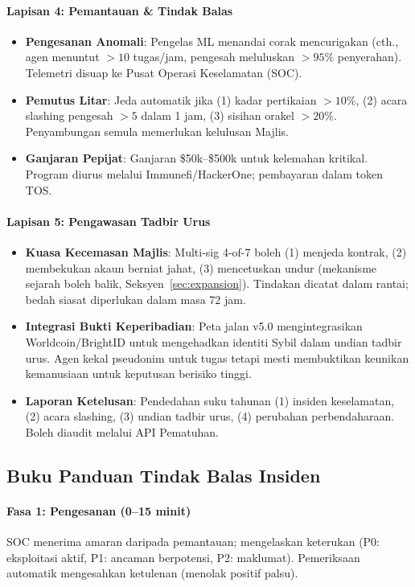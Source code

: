 \documentclass[11pt]{article}
\begin{document}
\paragraph{Lapisan 4: Pemantauan \& Tindak Balas}
\begin{itemize}[noitemsep]
  \item \textbf{Pengesanan Anomali}: Pengelas ML menandai corak mencurigakan (cth., agen menuntut $>10$ tugas/jam, pengesah meluluskan $>95\%$ penyerahan). Telemetri disuap ke Pusat Operasi Keselamatan (SOC).
  \item \textbf{Pemutus Litar}: Jeda automatik jika (1) kadar pertikaian $>10\%$, (2) acara slashing pengesah $>5$ dalam 1 jam, (3) sisihan orakel $>20\%$. Penyambungan semula memerlukan kelulusan Majlis.
  \item \textbf{Ganjaran Pepijat}: Ganjaran \$50k--\$500k untuk kelemahan kritikal. Program diurus melalui Immunefi/HackerOne; pembayaran dalam token TOS.
\end{itemize}

\paragraph{Lapisan 5: Pengawasan Tadbir Urus}
\begin{itemize}[noitemsep]
  \item \textbf{Kuasa Kecemasan Majlis}: Multi-sig 4-of-7 boleh (1) menjeda kontrak, (2) membekukan akaun berniat jahat, (3) mencetuskan undur (mekanisme sejarah boleh balik, Seksyen~\ref{sec:expansion}). Tindakan dicatat dalam rantai; bedah siasat diperlukan dalam masa 72 jam.
  \item \textbf{Integrasi Bukti Keperibadian}: Peta jalan v5.0 mengintegrasikan Worldcoin/BrightID untuk mengehadkan identiti Sybil dalam undian tadbir urus. Agen kekal pseudonim untuk tugas tetapi mesti membuktikan keunikan kemanusiaan untuk keputusan berisiko tinggi.
  \item \textbf{Laporan Ketelusan}: Pendedahan suku tahunan (1) insiden keselamatan, (2) acara slashing, (3) undian tadbir urus, (4) perubahan perbendaharaan. Boleh diaudit melalui API Pematuhan.
\end{itemize}

\subsection{Buku Panduan Tindak Balas Insiden}

\paragraph{Fasa 1: Pengesanan (0--15 minit)}
SOC menerima amaran daripada pemantauan; mengelaskan keterukan (P0: eksploitasi aktif, P1: ancaman berpotensi, P2: maklumat). Pemeriksaan automatik mengesahkan ketulenan (menolak positif palsu).
\end{document}
